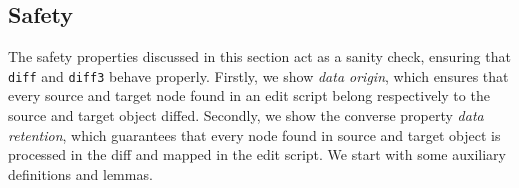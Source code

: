 \documentclass[preprint]{sigplanconf}
\theoremstyle{plain}
\begin{document}



    \subsection{Safety}
    The safety properties discussed in this section act as a sanity
    check, ensuring that \texttt{diff} and \texttt{diff3} behave
    properly.
    Firstly, we show \emph{data origin}, which ensures that every source
    and target node found in an edit script belong respectively to the
    source and target object diffed.  
    Secondly, we show the converse property \emph{data retention}, which 
    guarantees that every node found in source and target object is
    processed in the diff and mapped in the edit script.
    We start with some auxiliary definitions and lemmas.

\end{document}
